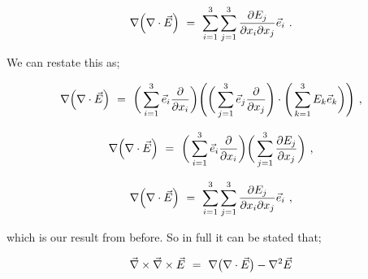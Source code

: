 \documentclass{article}
\begin{document}
\begin{equation} \label{eb-eq-51-46}
\nabla\Big(\nabla\cdot\vec{E}\Big) \hspace{0.125cm} = \hspace{0.125cm} \sum_{i=1}^{3} \sum_{j=1}^{3} \frac{\partial{E_j}}{\partial{x_i}\partial{x_j}} \vec{e}_i \hspace{0.125cm} .
\end{equation}

We can restate this as;

\begin{equation} \label{eb-eq-51-47}
\nabla\Big(\nabla\cdot\vec{E}\Big) \hspace{0.125cm} = \hspace{0.125cm} \bigg( \sum_{i=1}^{3} \vec{e}_i \frac{\partial}{\partial{x_i}} \bigg)\Bigg(\bigg( \sum_{j=1}^{3} \vec{e}_j \frac{\partial}{\partial{x_j}} \Bigg)\cdot\Bigg( \sum_{k=1}^{3} E_k \vec{e}_k \bigg)\Bigg) \hspace{0.125cm} ,
\end{equation}

\begin{equation} \label{eb-eq-51-48}
\nabla\Big(\nabla\cdot\vec{E}\Big) \hspace{0.125cm} = \hspace{0.125cm} \bigg( \sum_{i=1}^{3} \vec{e}_i \frac{\partial}{\partial{x_i}} \bigg)\bigg( \sum_{j=1}^{3} \frac{\partial{E_j}}{\partial{x_j}} \bigg) \hspace{0.125cm} ,
\end{equation}

\begin{equation} \label{eb-eq-51-49}
\nabla\Big(\nabla\cdot\vec{E}\Big) \hspace{0.125cm} = \hspace{0.125cm} \sum_{i=1}^{3} \sum_{j=1}^{3} \frac{\partial{E_j}}{\partial{x_i}\partial{x_j}} \vec{e}_i \hspace{0.125cm} ,
\end{equation}

which is our result from before. So in full it can be stated that;

\begin{equation} \label{eb-eq-51-50}
\vec{\nabla}\times\vec{\nabla}\times\vec{E} \hspace{0.125cm} = \hspace{0.125cm} \nabla\big(\nabla\cdot\vec{E}\big) - \nabla^{2}\vec{E}
\end{equation}
\end{document}
